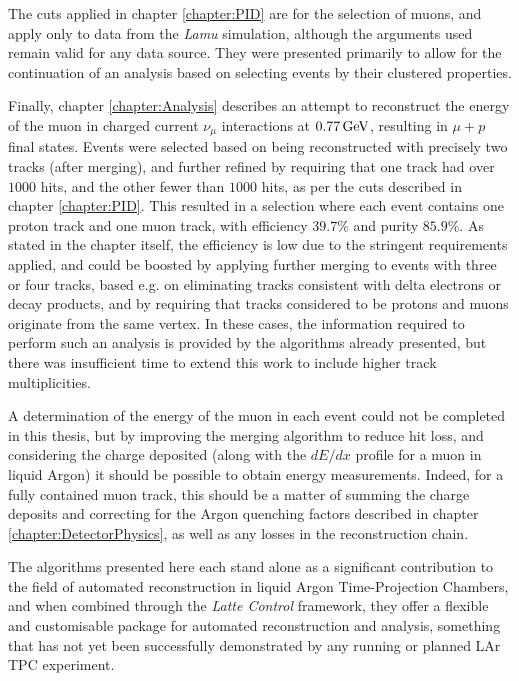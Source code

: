 The cuts applied in chapter \ref{chapter:PID} are for the selection of muons, and apply only to data from the \emph{Lamu} simulation, although the arguments used remain valid for any data source. They were presented primarily to allow for the continuation of an analysis based on selecting events by their clustered properties.

Finally, chapter \ref{chapter:Analysis} describes an attempt to reconstruct the energy of the muon in charged current $\nu_\mu$ interactions at $0.77\,\mathrm{GeV}$, resulting in $\mu + p$ final states. Events were selected based on being reconstructed with precisely two tracks (after merging), and further refined by requiring that one track had over $1000$ hits, and the other fewer than $1000$ hits, as per the cuts described in chapter \ref{chapter:PID}. This resulted in a selection where each event contains one proton track and one muon track, with efficiency $39.7\%$ and purity $85.9\%$. As stated in the chapter itself, the efficiency is low due to the stringent requirements applied, and could be boosted by applying further merging to events with three or four tracks, based e.g. on eliminating tracks consistent with delta electrons or decay products, and by requiring that tracks considered to be protons and muons originate from the same vertex. In these cases, the information required to perform such an analysis is provided by the algorithms already presented, but there was insufficient time to extend this work to include higher track multiplicities.

A determination of the energy of the muon in each event could not be completed in this thesis, but by improving the merging algorithm to reduce hit loss, and considering the charge deposited (along with the $dE/dx$ profile for a muon in liquid Argon) it should be possible to obtain energy measurements. Indeed, for a fully contained muon track, this should be a matter of summing the charge deposits and correcting for the Argon quenching factors described in chapter \ref{chapter:DetectorPhysics}, as well as any losses in the reconstruction chain.

The algorithms presented here each stand alone as a significant contribution to the field of automated reconstruction in liquid Argon Time-Projection Chambers, and when combined through the \emph{Latte Control} framework, they offer a flexible and customisable package for automated reconstruction and analysis, something that has not yet been successfully demonstrated by any running or planned \ac{LAr TPC} experiment.
